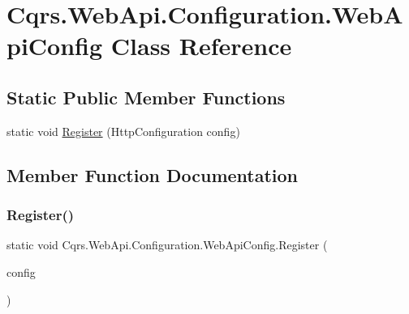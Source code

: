 \hypertarget{classCqrs_1_1WebApi_1_1Configuration_1_1WebApiConfig}{}\section{Cqrs.\+Web\+Api.\+Configuration.\+Web\+Api\+Config Class Reference}
\label{classCqrs_1_1WebApi_1_1Configuration_1_1WebApiConfig}
\subsection*{Static Public Member Functions}
\begin{DoxyCompactItemize}
\item 
static void \hyperlink{classCqrs_1_1WebApi_1_1Configuration_1_1WebApiConfig_a65d94167bd8c0e38ae6492adf3e56f5a_a65d94167bd8c0e38ae6492adf3e56f5a}{Register} (Http\+Configuration config)
\end{DoxyCompactItemize}


\subsection{Member Function Documentation}
\mbox{\label{classCqrs_1_1WebApi_1_1Configuration_1_1WebApiConfig_a65d94167bd8c0e38ae6492adf3e56f5a_a65d94167bd8c0e38ae6492adf3e56f5a}} 
\subsubsection{\texorpdfstring{Register()}{Register()}}
{\footnotesize\ttfamily static void Cqrs.\+Web\+Api.\+Configuration.\+Web\+Api\+Config.\+Register (\begin{DoxyParamCaption}\item[{Http\+Configuration}]{config }\end{DoxyParamCaption})\hspace{0.3cm}{\ttfamily [static]}}

